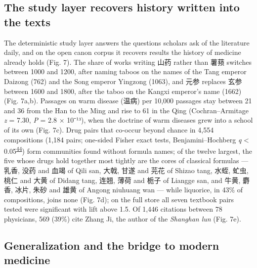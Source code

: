 \documentclass[
]{article}
\begin{document}
\hypertarget{the-study-layer-recovers-history-written-into-the-texts}{%
\subsection{The study layer recovers history written into the
texts}\label{the-study-layer-recovers-history-written-into-the-texts}}

The deterministic study layer answers the questions scholars ask of the
literature daily, and on the open canon corpus it recovers results the
history of medicine already holds (Fig. 7). The share of works writing
山药 rather than 薯蓣 switches between 1000 and 1200, after naming
taboos on the names of the Tang emperor Daizong (762) and the Song
emperor Yingzong (1063), and 元参 replaces 玄参 between 1600 and 1800,
after the taboo on the Kangxi emperor's name (1662) (Fig. 7a,b).
Passages on warm disease (温病) per 10,000 passages stay between 21 and
36 from the Han to the Ming and rise to 61 in the Qing
(Cochran--Armitage \emph{z} = 7.30, \emph{P} = 2.8 × 10⁻¹³), when the
doctrine of warm diseases grew into a school of its own (Fig. 7c). Drug
pairs that co-occur beyond chance in 4,554 compositions (1,184 pairs;
one-sided Fisher exact tests, Benjamini--Hochberg \emph{q} \textless{}
0.05\textsuperscript{\protect\hyperlink{ref-benjamini1995fdr}{44}}) form
communities found without formula names; of the twelve largest, the five
whose drugs hold together most tightly are the cores of classical
formulas --- 乳香, 没药 and 血竭 of Qili san, 大戟, 甘遂 and 芫花 of
Shizao tang, 水蛭, 虻虫, 桃仁 and 大黄 of Didang tang, 连翘, 薄荷 and
栀子 of Liangge san, and 牛黄, 麝香, 冰片, 朱砂 and 雄黄 of Angong
niuhuang wan --- while liquorice, in 43\% of compositions, joins none
(Fig. 7d); on the full store all seven textbook pairs tested were
significant with lift above 1.5. Of 1,446 citations between 78
physicians, 569 (39\%) cite Zhang Ji, the author of the \emph{Shanghan
lun} (Fig. 7e).

\hypertarget{generalization-and-the-bridge-to-modern-medicine}{%
\subsection{Generalization and the bridge to modern
medicine}\label{generalization-and-the-bridge-to-modern-medicine}}
\end{document}
